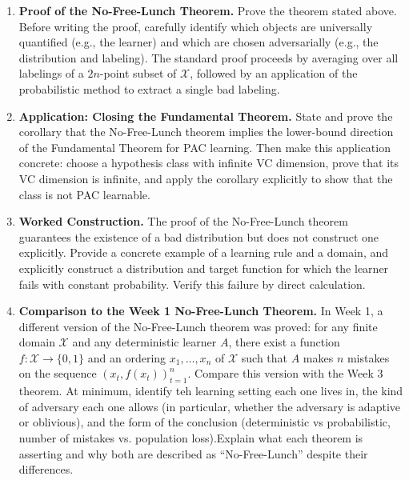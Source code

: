 \documentclass[11pt]{article}
\begin{document}
\begin{enumerate}
\item \textbf{Proof of the No-Free-Lunch Theorem.}  
Prove the theorem stated above. Before writing the proof, carefully identify which objects are universally quantified (e.g., the learner) and which are chosen adversarially (e.g., the distribution and labeling). The standard proof proceeds by averaging over all labelings of a $2n$-point subset of $\mathcal X$, followed by an application of the probabilistic method to extract a single bad labeling.

\item \textbf{Application: Closing the Fundamental Theorem.}  
State and prove the corollary that the No-Free-Lunch theorem implies the lower-bound direction of the Fundamental Theorem for PAC learning. Then make this application concrete: choose a hypothesis class with infinite VC dimension, prove that its VC dimension is infinite, and apply the corollary explicitly to show that the class is not PAC learnable.

\item \textbf{Worked Construction.}  
The proof of the No-Free-Lunch theorem guarantees the existence of a bad distribution but does not construct one explicitly. Provide a concrete example of a learning rule and a domain, and explicitly construct a distribution and target function for which the learner fails with constant probability. Verify this failure by direct calculation.

\item \textbf{Comparison to the Week 1 No-Free-Lunch Theorem.}  
In Week 1, a different version of the No-Free-Lunch theorem was proved: for any finite domain $\mathcal X$ and any deterministic learner $A$, there exist a function $f:\mathcal X\to\{0,1\}$ and an ordering $x_1,\dots,x_n$ of $\mathcal X$ such that $A$ makes $n$ mistakes on the sequence $(x_t,f(x_t))_{t=1}^n$. Compare this version with the Week 3 theorem. At minimum, identify teh learning setting each one lives in, the kind of adversary each one allows (in particular, whether the adversary is adaptive or oblivious), and the form of the conclusion (deterministic vs probabilistic, number of mistakes vs. population loss).Explain what each theorem is asserting and why both are described as “No-Free-Lunch” despite their differences.

\end{enumerate}
\end{document}
